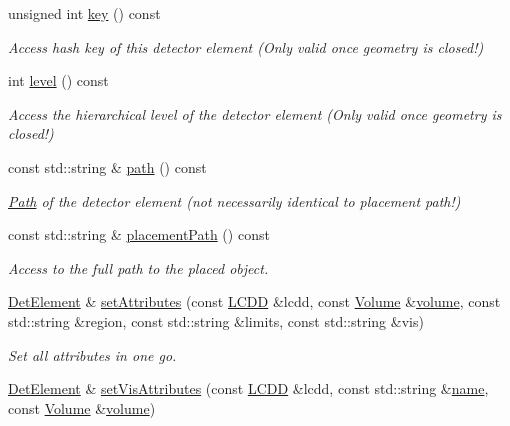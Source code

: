 \begin{DoxyCompactItemize}
unsigned int \hyperlink{class_d_d4hep_1_1_geometry_1_1_det_element_a56e60c088beb44d273156bdef726580e}{key} () const
\begin{DoxyCompactList}\small\item\em Access hash key of this detector element (Only valid once geometry is closed!) \end{DoxyCompactList}\item 
int \hyperlink{class_d_d4hep_1_1_geometry_1_1_det_element_af80cc6972c24efbcabbfc856e0b472a9}{level} () const
\begin{DoxyCompactList}\small\item\em Access the hierarchical level of the detector element (Only valid once geometry is closed!) \end{DoxyCompactList}\item 
const std\+::string \& \hyperlink{class_d_d4hep_1_1_geometry_1_1_det_element_a5f8b4268684a3cd4a5f613181a8bac83}{path} () const
\begin{DoxyCompactList}\small\item\em \hyperlink{class_d_d4hep_1_1_path}{Path} of the detector element (not necessarily identical to placement path!) \end{DoxyCompactList}\item 
const std\+::string \& \hyperlink{class_d_d4hep_1_1_geometry_1_1_det_element_a45aa21f312dff00397e67813dda9222b}{placement\+Path} () const
\begin{DoxyCompactList}\small\item\em Access to the full path to the placed object. \end{DoxyCompactList}\item 
\hyperlink{class_d_d4hep_1_1_geometry_1_1_det_element}{Det\+Element} \& \hyperlink{class_d_d4hep_1_1_geometry_1_1_det_element_a42520475d452cb0af9d6541cfe440a4a}{set\+Attributes} (const \hyperlink{class_d_d4hep_1_1_geometry_1_1_l_c_d_d}{L\+C\+DD} \&lcdd, const \hyperlink{class_d_d4hep_1_1_geometry_1_1_volume}{Volume} \&\hyperlink{class_d_d4hep_1_1_geometry_1_1_det_element_a14e0d9333e42b32629beb57fee5af167}{volume}, const std\+::string \&region, const std\+::string \&limits, const std\+::string \&vis)
\begin{DoxyCompactList}\small\item\em Set all attributes in one go. \end{DoxyCompactList}\item 
\hyperlink{class_d_d4hep_1_1_geometry_1_1_det_element}{Det\+Element} \& \hyperlink{class_d_d4hep_1_1_geometry_1_1_det_element_a7dc1ba8329573379fa2f087cee977c98}{set\+Vis\+Attributes} (const \hyperlink{class_d_d4hep_1_1_geometry_1_1_l_c_d_d}{L\+C\+DD} \&lcdd, const std\+::string \&\hyperlink{class_d_d4hep_1_1_handle_a27c7d467a609ab32c133e1f3c7d85ef5}{name}, const \hyperlink{class_d_d4hep_1_1_geometry_1_1_volume}{Volume} \&\hyperlink{class_d_d4hep_1_1_geometry_1_1_det_element_a14e0d9333e42b32629beb57fee5af167}{volume})

\end{DoxyCompactItemize}
